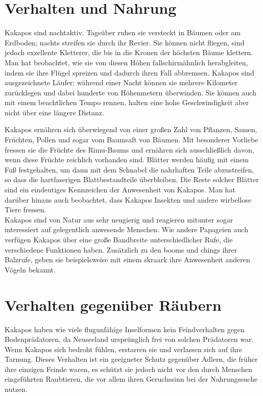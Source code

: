 \documentclass{scrartcl}
\begin{document}
\section*{Verhalten und Nahrung}
\begin{multicols}{2}
Kakapos sind nachtaktiv. Tagsüber ruhen sie versteckt in Bäumen oder am Erdboden; nachts streifen sie durch ihr Revier. Sie können nicht fliegen, sind jedoch exzellente Kletterer, die bis in die Kronen der höchsten Bäume klettern. Man hat beobachtet, wie sie von diesen Höhen fallschirmähnlich herabgleiten, indem sie ihre Flügel spreizen und dadurch ihren Fall abbremsen. Kakapos sind ausgezeichnete Läufer; während einer Nacht können sie mehrere Kilometer zurücklegen und dabei hunderte von Höhenmetern überwinden. Sie können auch mit einem beachtlichen Tempo rennen, halten eine hohe Geschwindigkeit aber nicht über eine längere Distanz.\par\medskip
Kakapos ernähren sich überwiegend von einer großen Zahl von Pflanzen, Samen, Früchten, Pollen und sogar vom Baumsaft von Bäumen. Mit besonderer Vorliebe fressen sie die Früchte des Rimu-Baums und ernähren sich ausschließlich davon, wenn diese Früchte reichlich vorhanden sind. Blätter werden häufig mit einem Fuß festgehalten, um dann mit dem Schnabel die nahrhaften Teile abzustreifen, so dass die hartfaserigen Blattbestandteile überbleiben. Die Reste solcher Blätter sind ein eindeutiges Kennzeichen der Anwesenheit von Kakapos. Man hat darüber hinaus auch beobachtet, dass Kakapos Insekten und andere wirbellose Tiere fressen.\\ 
Kakapos sind von Natur aus sehr neugierig und reagieren mitunter sogar interessiert auf gelegentlich anwesende Menschen. Wie andere Papageien auch verfügen Kakapos über eine große Bandbreite unterschiedlicher Rufe, die verschiedene Funktionen haben. Zusätzlich zu den booms und chings ihrer Balzrufe, geben sie beispielsweise mit einem skraark ihre Anwesenheit anderen Vögeln bekannt.
\end{multicols}

\section*{Verhalten gegenüber Räubern}
\begin{multicols}{2}
Kakapos haben wie viele flugunfähige Inselformen kein Feindverhalten gegen Bodenprädatoren, da Neuseeland ursprünglich frei von solchen Prädatoren war. Wenn Kakapos sich bedroht fühlen, erstarren sie und verlassen sich auf ihre Tarnung. Dieses Verhalten ist ein geeigneter Schutz gegenüber Adlern, die früher ihre einzigen Feinde waren, es schützt sie jedoch nicht vor den durch Menschen eingeführten Raubtieren, die vor allem ihren Geruchssinn bei der Nahrungssuche nutzen.
\end{multicols}
\end{document}

